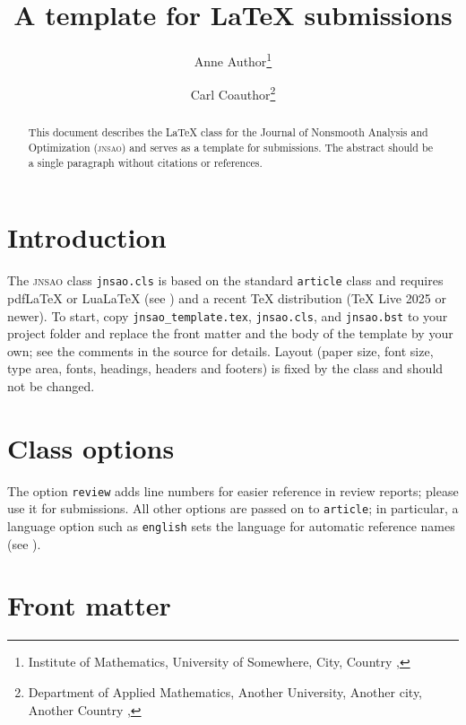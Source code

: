 \documentclass[english,review]{jnsao}
\title{A template for \texorpdfstring{\jnsao{} \LaTeX}{JNSAO LaTeX} submissions}
\author{%
    Anne Author\thanks{Institute of Mathematics, University of Somewhere, City, Country
        \email{anne.author@example.org}, \orcid{0000-0002-1825-0097}}
    \and
    Carl Coauthor\thanks{Department of Applied Mathematics, Another University, Another city, Another Country
        \email{carl.coauthor@example.org}, \orcid{0000-0002-1825-0097}}
}
\newcommand{\jnsao}{\textsc{jnsao}}
\newcommand{\pkg}[1]{\texttt{#1}}
\begin{document}

\maketitle

\begin{abstract}
    This document describes the \LaTeX{} class for the Journal of Nonsmooth Analysis and Optimization (\jnsao) and serves as a template for submissions. The abstract should be a single paragraph without citations or references.
\end{abstract}

\section{Introduction}\label{sec:intro}

The \jnsao{} class \pkg{jnsao.cls} is based on the standard \pkg{article} class and requires pdf\LaTeX{} or Lua\LaTeX{} (see ) and a recent \TeX{} distribution (\TeX{} Live 2025 or newer). To start, copy \pkg{jnsao\_template.tex}, \pkg{jnsao.cls}, and \pkg{jnsao.bst} to your project folder and replace the front matter and the body of the template by your own; see the comments in the source for details. Layout (paper size, font size, type area, fonts, headings, headers and footers) is fixed by the class and should not be changed.

\section{Class options}

The option \pkg{review} adds line numbers for easier reference in review reports; please use it for submissions. All other options are passed on to \pkg{article}; in particular, a language option such as \pkg{english} sets the language for automatic reference names (see ).

\section{Front matter}\label{sec:frontmatter}
\end{document}
